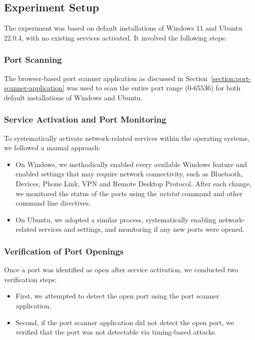 \subsection{Experiment Setup}

The experiment was based on default installations of Windows 11 and Ubuntu 22.0.4, with no existing services activated. It involved the following steps:

\subsubsection{Port Scanning}

The browser-based port scanner application as discussed in Section~\ref{section:port-scanner-application} was used to scan the entire port range (0-65536) for both default installations of Windows and Ubuntu.

\subsubsection{Service Activation and Port Monitoring}

To systematically activate network-related services within the operating systems, we followed a manual approach:

\begin{itemize}
    \item On Windows, we methodically enabled every available Windows feature and enabled settings that may require network connectivity, such as Bluetooth, Devices, Phone Link, VPN and Remote Desktop Protocol. After each change, we monitored the status of the ports using the \emph{netstat} command and other command line directives.
    \item On Ubuntu, we adopted a similar process, systematically enabling network-related services and settings, and monitoring if any new ports were opened.
\end{itemize}

\subsubsection{Verification of Port Openings}

Once a port was identified as open after service activation, we conducted two verification steps:

\begin{itemize}
    \item First, we attempted to detect the open port using the port scanner application. 
    \item Second, if the port scanner application did not detect the open port, we verified that the port was not detectable via timing-based attacks.
\end{itemize}

